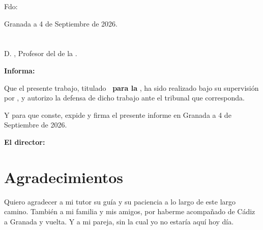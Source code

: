 \vspace{6cm}

\noindent Fdo: {\myName}

\vspace{2cm}

\begin{flushright}
Granada a 4 de Septiembre de 2026.
\end{flushright}


\chapter*{}
\thispagestyle{empty}


D. \textbf{\myProf}, Profesor del {\myDepartment} de la {\myUni}.

\vspace{0.5cm}

\textbf{Informa:}

\vspace{0.5cm}

Que el presente trabajo, titulado \textbf{\myTitle \ para la \mySubTitle}, ha sido realizado bajo su supervisión por \textbf{\myName}, y autorizo la defensa de dicho trabajo ante el tribunal que corresponda.

\vspace{0.5cm}

Y para que conste, expide y firma el presente informe en Granada a 4 de Septiembre de 2026.

\vspace{1cm}

\textbf{El director:}

\vspace{5cm}

\noindent \textbf{ \myProf }

\chapter*{Agradecimientos}
\thispagestyle{empty}
\vspace{1cm}


Quiero agradecer a mi tutor su guía y su paciencia a lo largo de este largo camino. También a mi familia y mis amigos, por haberme acompañado de Cádiz a Granada y vuelta. Y a mi pareja, sin la cual yo no estaría aquí hoy día.
